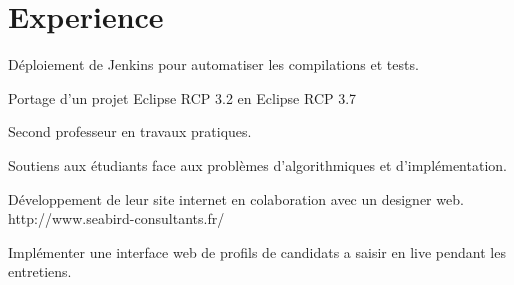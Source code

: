 \documentclass[letterpaper]{deedy-resume} %
\begin{document}
\begin{minipage}[t]{0.66\textwidth} %


\section{Experience}


\vspace{\topsep} %
\begin{tightitemize}
\item Déploiement de Jenkins pour automatiser les compilations et tests.
\item Portage d'un projet Eclipse RCP 3.2 en Eclipse RCP 3.7
\end{tightitemize}

\sectionspace %



\begin{tightitemize}
\item Second professeur en travaux pratiques.
\item Soutiens aux étudiants face aux problèmes d’algorithmiques et d’implémentation.
\end{tightitemize}

\sectionspace %



\begin{tightitemize}
\item Développement de leur site internet en colaboration avec un designer web. http://www.seabird-consultants.fr/
\item Implémenter une interface web de profils de candidats a saisir en live pendant les entretiens.
\end{tightitemize}


\end{minipage}
\end{document}
